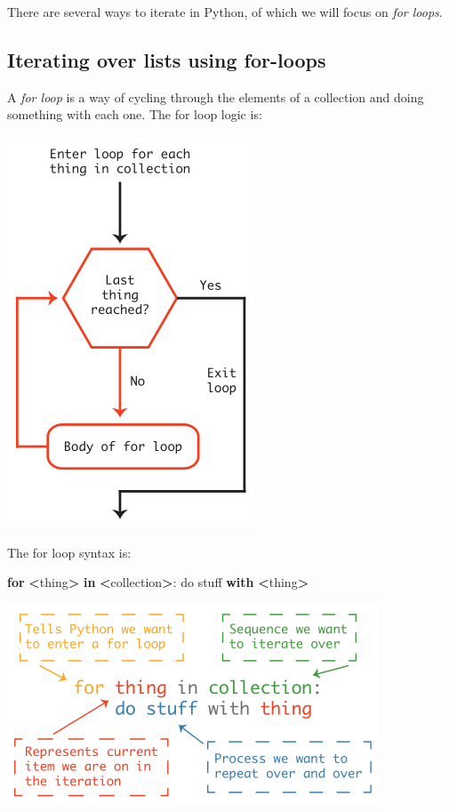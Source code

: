 \documentclass[
]{book}
\newenvironment{Shaded}{\begin{snugshade}}{\end{snugshade}}
\newcommand{\ControlFlowTok}[1]{\textcolor[rgb]{0.13,0.29,0.53}{\textbf{#1}}}
\newcommand{\KeywordTok}[1]{\textcolor[rgb]{0.13,0.29,0.53}{\textbf{#1}}}
\newcommand{\NormalTok}[1]{#1}
\newcommand{\OperatorTok}[1]{\textcolor[rgb]{0.81,0.36,0.00}{\textbf{#1}}}
\begin{document}
There are several ways to iterate in Python, of which we will focus on \emph{for loops}.

\hypertarget{iterating-over-lists-using-for-loops}{%
\subsection{Iterating over lists using for-loops}\label{iterating-over-lists-using-for-loops}}

A \emph{for loop} is a way of cycling through the elements of a collection and doing something with each one. The for loop logic is:

\includegraphics{Python/PythonIntro/images/for_loop_pic_small.png}

The for loop syntax is:

\begin{Shaded}
\begin{Highlighting}[]
\ControlFlowTok{for} \OperatorTok{\textless{}}\NormalTok{thing}\OperatorTok{\textgreater{}} \KeywordTok{in} \OperatorTok{\textless{}}\NormalTok{collection}\OperatorTok{\textgreater{}}\NormalTok{:}
\NormalTok{    do stuff }\ControlFlowTok{with} \OperatorTok{\textless{}}\NormalTok{thing}\OperatorTok{\textgreater{}}
\end{Highlighting}
\end{Shaded}

\includegraphics{Python/PythonIntro/images/python_for_loop_small.png}
\end{document}
